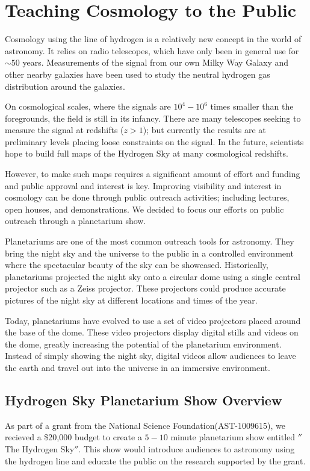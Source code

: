 \chapter{Teaching \cm Cosmology to the Public}\label{Ch:Planet}
Cosmology using the \cm line of hydrogen is a relatively new concept in the world of astronomy. It relies on radio telescopes, which have only been in general use for $\sim 50$ years. Measurements of the \cm signal from our own Milky Way Galaxy and other nearby galaxies have been used to study the neutral hydrogen gas distribution around the galaxies. 

On cosmological scales, where the \cm signals are $10^4 - 10^6$ times smaller than the foregrounds, the field is still in its infancy. There are many telescopes seeking to measure the \cm signal at redshifts ($z>1$); but currently the results are at preliminary levels placing loose constraints on the signal. In the future, scientists hope to build full maps of the Hydrogen Sky at many cosmological redshifts.  

However, to make such maps requires a significant amount of effort and funding and public approval and interest is key. Improving visibility and interest in \cm cosmology can be done through public outreach activities; including lectures, open houses, and demonstrations. We decided to focus our efforts on public outreach through a planetarium show. 

Planetariums are one of the most common outreach tools for astronomy. They bring the night sky and the universe to the public in a controlled environment where the spectacular beauty of the sky can be showcased. Historically, planetariums projected the night sky onto a circular dome using a single central projector such as a Zeiss projector. These projectors could produce accurate pictures of the night sky at different locations and times of the year.

Today, planetariums have evolved to use a set of video projectors placed around the base of the dome. These video projectors display digital stills and videos on the dome, greatly increasing the potential of the planetarium environment. Instead of simply showing the night sky, digital videos allow audiences to leave the earth and travel out into the universe in an immersive environment. 

\section{Hydrogen Sky Planetarium Show Overview}
As part of a grant from the National Science Foundation(AST-1009615), we recieved a \$20,000 budget to create a $5-10$ minute planetarium show entitled $''$The Hydrogen Sky$''$. This show would introduce audiences to astronomy using the \cm hydrogen line and educate the public on the research supported by the grant. 

